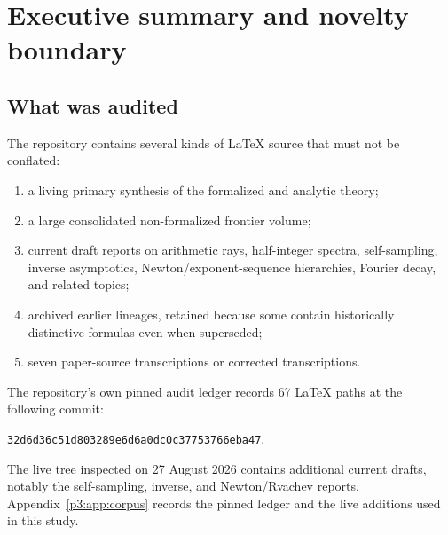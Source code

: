 \documentclass[11pt,oneside]{article}
\theoremstyle{definition}
\begin{document}
\begin{abstract}
For the signed Thue--Morse generating function \(E(z)\), a new formal orthogonality
analysis proves
\[
 p_{2n}(x)=p_n(x^2),\qquad a_n=(-1)^{n+1},
\]
and gives an exact nonlinear dyadic recursion for the remaining Jacobi coefficients.
At \(N=2^m\), \(p_N(x)=x^N+1\), producing the closed Pad\'e approximant
\[
 E(z)=\frac{\prod_{j<m}(1-z^{2^j})}{1+z^N}+O(z^{2N}).
\]
Its roots-of-minus-one partial fractions furnish an \(N\)-node complex quadrature that
reproduces \(2N\) consecutive Thue--Morse signs.  Krawtchouk, contour, residue, integral,
and antiperiodic Fourier representations of the signed and unsigned words are collected as
well.  A fully commented Python program, exact rational data, high-precision residuals,
and four reproducible figures accompany the report.  Every theorem labelled as new is
proved here; conjectures are clearly separated from established statements.
\end{abstract}


\newpage

\section{Executive summary and novelty boundary}

\subsection{What was audited}

The repository contains several kinds of LaTeX source that must not be conflated:

\begin{enumerate}
\item a living primary synthesis of the formalized and analytic theory;
\item a large consolidated non-formalized frontier volume;
\item current draft reports on arithmetic rays, half-integer spectra, self-sampling,
      inverse asymptotics, Newton/exponent-sequence hierarchies, Fourier decay, and related
      topics;
\item archived earlier lineages, retained because some contain historically distinctive
      formulas even when superseded;
\item seven paper-source transcriptions or corrected transcriptions.
\end{enumerate}

The repository's own pinned audit ledger records 67 LaTeX paths at the following commit:
\begin{center}
\small\texttt{32d6d36c51d803289e6d6a0dc0c37753766eba47}.
\end{center}
The live tree inspected on 27 August 2026 contains additional current drafts, notably the
self-sampling, inverse, and Newton/Rvachev reports.  Appendix~\ref{p3:app:corpus} records the pinned ledger and the live
additions used in this study.
\end{document}
